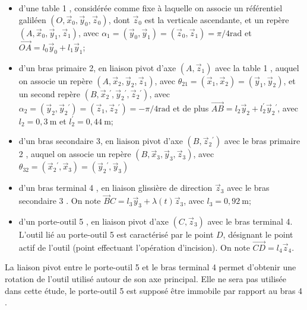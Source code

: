 \begin{itemize}
  \item d'une table 1 , considérée comme fixe à laquelle on associe un référentiel galiléen $\left(O, \vec{x}_{0}, \vec{y}_{0}, \vec{z}_{0}\right)$, dont $\vec{z}_{0}$ est la verticale ascendante, et un repère $\left(A, \vec{x}_{0}, \vec{y}_{1}, \vec{z}_{1}\right)$, avec $\alpha_{1}=\left(\vec{y}_{0}, \vec{y}_{1}\right)=\left(\vec{z}_{0}, \vec{z}_{1}\right)=\pi / 4 \mathrm{rad}$ et $\overrightarrow{O A}=l_{0} \vec{y}_{0}+l_{1} \vec{y}_{1}$;
  \item d'un bras primaire 2, en liaison pivot d'axe $\left(A, \vec{z}_{1}\right)$ avec la table 1 , auquel on associe un repère $\left(A, \vec{x}_{2}, \vec{y}_{2}, \vec{z}_{1}\right)$, avec $\theta_{21}=\left(\vec{x}_{1}, \vec{x}_{2}\right)=\left(\vec{y}_{1}, \vec{y}_{2}\right)$, et un second repère $\left(B, \vec{x}_{2}{ }^{\prime}, \vec{y}_{2}{ }^{\prime}, \vec{z}_{2}{ }^{\prime}\right)$, avec $\alpha_{2}=\left(\vec{y}_{2}, \vec{y}_{2}{ }^{\prime}\right)=\left(\vec{z}_{1}, \vec{z}_{2}{ }^{\prime}\right)=-\pi / 4 \mathrm{rad}$ et de plus $\overrightarrow{A B}=l_{2} \vec{y}_{2}+l_{2}^{\prime} \vec{y}_{2}{ }^{\prime}$, avec $l_{2}=0,3 \mathrm{~m}$ et $l_{2}^{\prime}=0,44 \mathrm{~m}$;
  \item d'un bras secondaire 3, en liaison pivot d'axe $\left(B, \vec{z}_{2}{ }^{\prime}\right)$ avec le bras primaire 2 , auquel on associe un repère $\left(B, \vec{x}_{3}, \vec{y}_{3}, \vec{z}_{3}\right)$, avec $\theta_{32}=\left(\vec{x}_{2}{ }^{\prime}, \vec{x}_{3}\right)=\left(\vec{y}_{2}{ }^{\prime}, \vec{y}_{3}\right)$
  \item d'un bras terminal 4 , en liaison glissière de direction $\vec{z}_{3}$ avec le bras secondaire 3 . On note $\vec{B} C=l_{3} \vec{y}_{3}+\lambda(t) \vec{z}_{3}$, avec $l_{3}=0,92 \mathrm{~m} ;$
  \item d'un porte-outil 5 , en liaison pivot d'axe $\left(C, \vec{z}_{3}\right)$ avec le bras terminal 4. L'outil lié au porte-outil 5 est caractérisé par le point $D$, désignant le point actif de l'outil (point effectuant l'opération d'incision). On note $\overrightarrow{C D}=l_{4} \vec{z}_{4}$.
 \end{itemize}
 
La liaison pivot entre le porte-outil 5 et le bras terminal 4 permet d'obtenir une rotation de l'outil utilisé autour de son axe principal. Elle ne sera pas utilisée dans cette étude, le porte-outil 5 est supposé être immobile par rapport au bras 4 .\\

